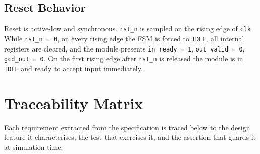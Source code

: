 \documentclass[11pt,a4paper]{article}
\begin{document}
\subsection*{Reset Behavior}

Reset is active-low and synchronous. \texttt{rst\_n} is sampled on the rising edge of
\texttt{clk}  While
\texttt{rst\_n = 0}, on every rising edge the FSM is forced to \texttt{IDLE}, all internal
registers are cleared, and the module presents \texttt{in\_ready = 1},
\texttt{out\_valid = 0}, \texttt{gcd\_out = 0}. On the first rising edge after
\texttt{rst\_n} is released the module is in \texttt{IDLE} and ready to accept input
immediately.

\section{Traceability Matrix}

Each requirement extracted from the specification is traced below to the design feature
it characterises, the test that exercises it, and
the assertion that guards it at simulation time.
\end{document}
